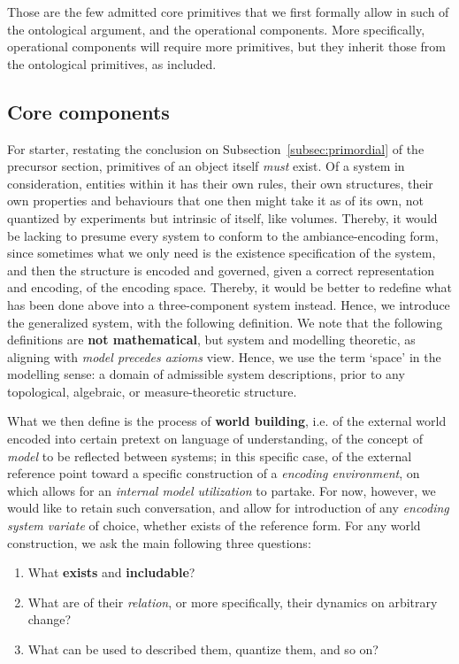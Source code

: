 Those are the few admitted core primitives that we first formally allow in such of the ontological argument, and the operational components. More specifically, operational components will require more primitives, but they inherit those from the ontological primitives, as included. 

\subsection{Core components}

For starter, restating the conclusion on Subsection~\ref{subsec:primordial} of the precursor section, primitives of an object itself \textit{must} exist. Of a system in consideration, entities within it has their own rules, their own structures, their own properties and behaviours that one then might take it as of its own, not quantized by experiments but intrinsic of itself, like volumes. Thereby, it would be lacking to presume every system to conform to the ambiance-encoding form, since sometimes what we only need is the existence specification of the system, and then the structure is encoded and governed, given a correct representation and encoding, of the encoding space. Thereby, it would be better to redefine what has been done above into a three-component system instead. Hence, we introduce the generalized system, with the following definition. We note that the following definitions are \textbf{not mathematical}, but system and modelling theoretic, as aligning with \textit{model precedes axioms} view. Hence, we use the term `space' in the modelling sense: a domain of admissible system descriptions, prior to any topological, algebraic, or measure-theoretic structure.

What we then define is the process of \textbf{world building}, i.e. of the external world encoded into certain pretext on language of understanding, of the concept of \textit{model} to be reflected between systems; in this specific case, of the external reference point toward a specific construction of a \textit{encoding environment}, on which allows for an \textit{internal model utilization} to partake. For now, however, we would like to retain such conversation, and allow for introduction of any \textit{encoding system variate} of choice, whether exists of the reference form. For any world construction, we ask the main following three questions: 

\begin{enumerate}[topsep=1pt,itemsep=1pt]
	\item What \textbf{exists} and \textbf{includable}? 
	\item What are of their \textit{relation}, or more specifically, their dynamics on arbitrary change?
	\item What can be used to described them, quantize them, and so on?
\end{enumerate}

